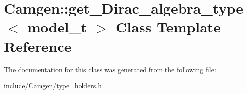 \hypertarget{a00247}{}\section{Camgen\+:\+:get\+\_\+\+Dirac\+\_\+algebra\+\_\+type$<$ model\+\_\+t $>$ Class Template Reference}
\label{a00247}


The documentation for this class was generated from the following file\+:\begin{DoxyCompactItemize}
\item 
include/\+Camgen/type\+\_\+holders.\+h\end{DoxyCompactItemize}

